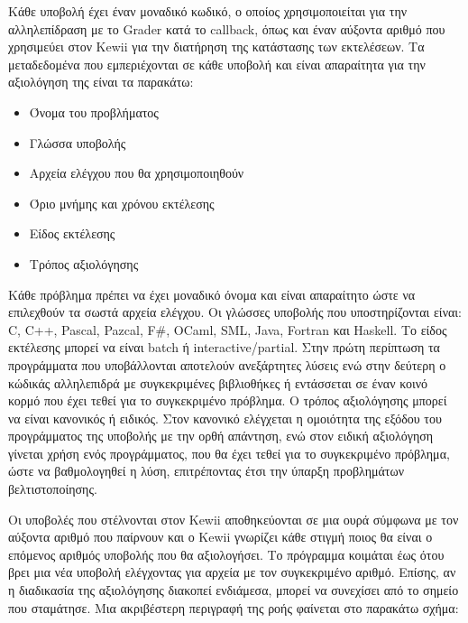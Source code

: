 \documentclass[diploma]{softlab-thesis}
\begin{document}
\bigskip

Κάθε υποβολή έχει έναν μοναδικό κωδικό, ο οποίος χρησιμοποιείται για την
αλληλεπίδραση με το Grader κατά το callback, όπως και έναν αύξοντα αριθμό που
χρησιμεύει στον Kewii για την διατήρηση της κατάστασης των εκτελέσεων. Τα
μεταδεδομένα που εμπεριέχονται σε κάθε υποβολή και είναι απαραίτητα για την
αξιολόγηση της είναι τα παρακάτω:

\begin{itemize}
  \item Όνομα του προβλήματος
  \item Γλώσσα υποβολής
  \item Αρχεία ελέγχου που θα χρησιμοποιηθούν
  \item Όριο μνήμης και χρόνου εκτέλεσης
  \item Είδος εκτέλεσης
  \item Τρόπος αξιολόγησης
\end{itemize}

Κάθε πρόβλημα πρέπει να έχει μοναδικό όνομα και είναι απαραίτητο ώστε να
επιλεχθούν τα σωστά αρχεία ελέγχου. Οι γλώσσες υποβολής που υποστηρίζονται
είναι: C, C++, Pascal, Pazcal, F\#, OCaml, SML, Java, Fortran και Haskell. Το
είδος εκτέλεσης μπορεί να είναι batch ή interactive/partial. Στην πρώτη
περίπτωση τα προγράμματα που υποβάλλονται αποτελούν ανεξάρτητες λύσεις ενώ στην
δεύτερη ο κώδικάς αλληλεπιδρά με συγκεκριμένες βιβλιοθήκες ή εντάσσεται σε έναν
κοινό κορμό που έχει τεθεί για το συγκεκριμένο πρόβλημα. Ο τρόπος αξιολόγησης
μπορεί να είναι κανονικός ή ειδικός. Στον κανονικό ελέγχεται η ομοιότητα της
εξόδου του προγράμματος της υποβολής με την ορθή απάντηση, ενώ στον ειδική
αξιολόγηση γίνεται χρήση ενός προγράμματος, που θα έχει τεθεί για το
συγκεκριμένο πρόβλημα, ώστε να βαθμολογηθεί η λύση, επιτρέποντας έτσι την
ύπαρξη προβλημάτων βελτιστοποίησης.

\bigskip

Οι υποβολές που στέλνονται στον Kewii αποθηκεύονται σε μια ουρά σύμφωνα με τον
αύξοντα αριθμό που παίρνουν και ο Kewii γνωρίζει κάθε στιγμή ποιος θα είναι ο
επόμενος αριθμός υποβολής που θα αξιολογήσει. Το πρόγραμμα κοιμάται έως ότου
βρει μια νέα υποβολή ελέγχοντας για αρχεία με τον συγκεκριμένο αριθμό. Επίσης,
αν η διαδικασία της αξιολόγησης διακοπεί ενδιάμεσα, μπορεί να συνεχίσει από το
σημείο που σταμάτησε. Μια ακριβέστερη περιγραφή της ροής φαίνεται στο παρακάτω
σχήμα:
\end{document}
